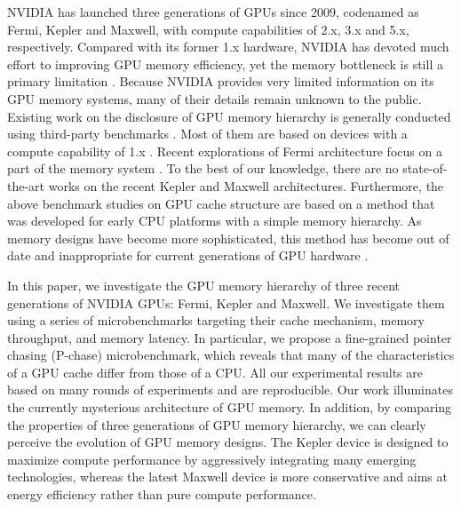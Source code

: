 \documentclass[10pt,journal,compsoc]{IEEEtran}
\theoremstyle{definition}
\begin{document}
NVIDIA has launched three generations of GPUs since 2009, codenamed as Fermi, Kepler and Maxwell, with compute capabilities of 2.x, 3.x and 5.x, respectively. Compared with its former 1.x hardware, NVIDIA has devoted much effort to improving GPU memory efficiency, yet the memory bottleneck is still a primary limitation \cite{fermiwhitepaper,keplerwhitepaper,keplertuningguide,MaxwellWhitepaper,MaxwellTuning,cudacprogrammingguide,cudabestguide}. Because NVIDIA provides very limited information on its GPU memory systems, many of their details remain unknown to the public. Existing work on the disclosure of GPU memory hierarchy is generally conducted using third-party benchmarks \cite{volkov2008benchmarking,papadopoulou2009micro,wong2010demystifying,zhang2011quantitative,
baghsorkhi2012efficient,meltzer2013micro}. Most of them are based on devices with a compute capability of 1.x \cite{volkov2008benchmarking,papadopoulou2009micro,wong2010demystifying,zhang2011quantitative}. Recent explorations of Fermi architecture focus on a part of the memory system \cite{baghsorkhi2012efficient,meltzer2013micro}. To the best of our knowledge, there are no state-of-the-art works on the recent Kepler and Maxwell architectures. Furthermore, the above benchmark studies on GPU cache structure are based on a method that was developed for early CPU platforms \cite{saavedra1992cpu, saavedra1995measuring} with a simple memory hierarchy. As memory designs have become more sophisticated, this method has become out of date and inappropriate for current generations of GPU hardware \cite{mei2014benchmarking}.

In this paper, we investigate the GPU memory hierarchy of three recent generations of NVIDIA GPUs: Fermi, Kepler and Maxwell. We investigate them using a series of microbenchmarks targeting their cache mechanism, memory throughput, and memory latency. In particular, we propose a fine-grained pointer chasing (P-chase) microbenchmark, which reveals that many of the characteristics of a GPU cache differ from those of a CPU. All our experimental results are based on many rounds of experiments and are reproducible. Our work illuminates the currently mysterious architecture of GPU memory. In addition, by comparing the properties of three generations of GPU memory hierarchy, we can clearly perceive the evolution of GPU memory designs. The Kepler device is designed to maximize compute performance by aggressively integrating many emerging technologies, whereas the latest Maxwell device is more conservative and aims at energy efficiency rather than pure compute performance.
\end{document}
